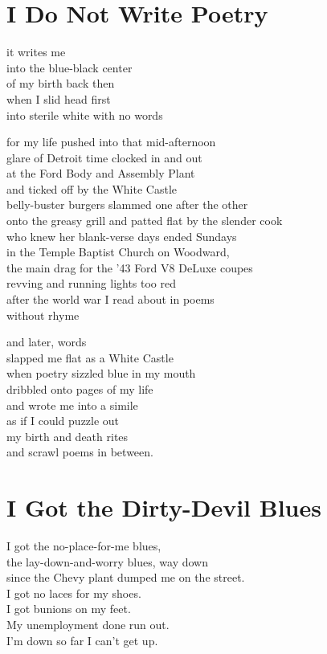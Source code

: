 \documentclass[twoside,10pt]{book}
\begin{document}
\clearpage
\section{I Do Not Write Poetry}

it writes me\\
into the blue-black center\\
of my birth back then\\
when I slid head first\\
into sterile white with no words

for my life pushed into that mid-afternoon\\
glare of Detroit time clocked in and out\\
at the Ford Body and Assembly Plant\\
and ticked off by the White Castle\\
belly-buster burgers slammed one after the other\\
onto the greasy grill and patted flat by the slender cook\\
who knew her blank-verse days ended Sundays\\
in the Temple Baptist Church on Woodward,\\
the main drag for the '43 Ford V8 DeLuxe coupes\\
revving and running lights too red\\
after the world war I read about in poems\\
without rhyme

and later, words\\
slapped me flat as a White Castle\\
when poetry sizzled blue in my mouth\\
dribbled onto pages of my life\\
and wrote me into a simile\\
as if I could puzzle out\\
my birth and death rites\\
and scrawl poems in between.


\clearpage
\section{I Got the Dirty-Devil Blues}

I got the no-place-for-me blues,\\
the lay-down-and-worry blues, way down\\
since the Chevy plant dumped me on the street.\\
I got no laces for my shoes.\\
I got bunions on my feet.\\
My unemployment done run out.\\
I'm down so far I can't get up.
\end{document}
